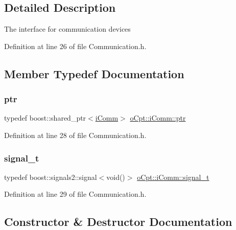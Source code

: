 \subsection{Detailed Description}
The interface for communication devices 

Definition at line 26 of file Communication.\+h.



\subsection{Member Typedef Documentation}
\hypertarget{classo_cpt_1_1i_comm_af0c655f143251b7d03fcd98f89637228}{}\label{classo_cpt_1_1i_comm_af0c655f143251b7d03fcd98f89637228} 
\subsubsection{\texorpdfstring{ptr}{ptr}}
{\footnotesize\ttfamily typedef boost\+::shared\+\_\+ptr$<$\hyperlink{classo_cpt_1_1i_comm}{i\+Comm}$>$ \hyperlink{classo_cpt_1_1i_comm_af0c655f143251b7d03fcd98f89637228}{o\+Cpt\+::i\+Comm\+::ptr}}



Definition at line 28 of file Communication.\+h.

\hypertarget{classo_cpt_1_1i_comm_a8226eab43e254e986c1645cb1c500ef7}{}\label{classo_cpt_1_1i_comm_a8226eab43e254e986c1645cb1c500ef7} 
\subsubsection{\texorpdfstring{signal\+\_\+t}{signal\_t}}
{\footnotesize\ttfamily typedef boost\+::signals2\+::signal$<$void()$>$ \hyperlink{classo_cpt_1_1i_comm_a8226eab43e254e986c1645cb1c500ef7}{o\+Cpt\+::i\+Comm\+::signal\+\_\+t}}



Definition at line 29 of file Communication.\+h.



\subsection{Constructor \& Destructor Documentation}
\hypertarget{classo_cpt_1_1i_comm_aa9570953ad88324fd17c41ddf59516e3}{}\label{classo_cpt_1_1i_comm_aa9570953ad88324fd17c41ddf59516e3} 
